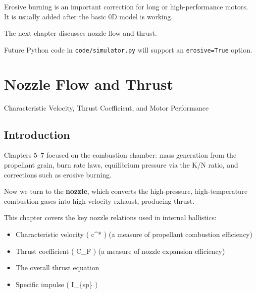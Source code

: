 \documentclass[
  letterpaper,
  DIV=11,
  numbers=noendperiod]{scrreprt}
\providecommand{\tightlist}{%
  \setlength{\itemsep}{0pt}\setlength{\parskip}{0pt}}
\begin{document}
Erosive burning is an important correction for long or high-performance
motors. It is usually added after the basic 0D model is working.

The next chapter discusses nozzle flow and thrust.

\begin{tcolorbox}[enhanced jigsaw, arc=.35mm, bottomrule=.15mm, bottomtitle=1mm, breakable, colback=white, colbacktitle=quarto-callout-note-color!10!white, colframe=quarto-callout-note-color-frame, coltitle=black, left=2mm, leftrule=.75mm, opacityback=0, opacitybacktitle=0.6, rightrule=.15mm, title=\textcolor{quarto-callout-note-color}{\faInfo}\hspace{0.5em}{Note}, titlerule=0mm, toprule=.15mm, toptitle=1mm]

Future Python code in \texttt{code/simulator.py} will support an
\texttt{erosive=True} option.

\end{tcolorbox}


\chapter{Nozzle Flow and Thrust}\label{nozzle-flow-and-thrust}

Characteristic Velocity, Thrust Coefficient, and Motor Performance

\hfill\break

\section{Introduction}\label{introduction-5}

Chapters 5--7 focused on the combustion chamber: mass generation from
the propellant grain, burn rate laws, equilibrium pressure via the K/N
ratio, and corrections such as erosive burning.

Now we turn to the \textbf{nozzle}, which converts the high-pressure,
high-temperature combustion gases into high-velocity exhaust, producing
thrust.

This chapter covers the key nozzle relations used in internal
ballistics:

\begin{itemize}
\tightlist
\item
  Characteristic velocity ( c\^{}* ) (a measure of propellant combustion
  efficiency)
\item
  Thrust coefficient ( C\_F ) (a measure of nozzle expansion efficiency)
\item
  The overall thrust equation
\item
  Specific impulse ( I\_\{sp\} )
\end{itemize}
\end{document}
